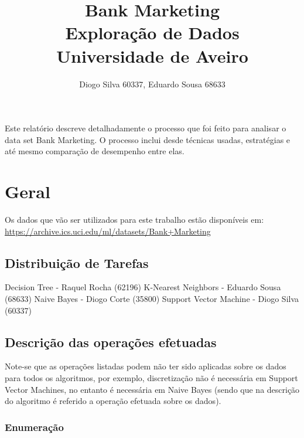 \documentclass[portugues,final]{revdetua}
\begin{document}

\title{\textbf{Bank Marketing}\\ Exploração de Dados \\Universidade de Aveiro}
\author{Diogo Silva 60337, Eduardo Sousa 68633}
\maketitle
\begin{resumo} %
Este relatório descreve detalhadamente o processo que foi feito para analisar o data set Bank Marketing.
O processo inclui desde técnicas usadas, estratégias e até mesmo comparação de desempenho entre elas.
\end{resumo}

\section{Geral}

Os dados que vão ser utilizados para este trabalho estão disponíveis em:
\url{https://archive.ics.uci.edu/ml/datasets/Bank+Marketing}

\subsection{Distribuição de Tarefas}

Decision Tree - Raquel Rocha (62196)
K-Nearest Neighbors - Eduardo Sousa (68633)
Naive Bayes - Diogo Corte (35800)
Support Vector Machine - Diogo Silva (60337)

\subsection{Descrição das operações efetuadas}

Note-se que as operações listadas podem não ter sido aplicadas sobre os dados para todos os algoritmos, por exemplo, discretização não é necessária em Support Vector Machines, no entanto é necessária em Naive Bayes (sendo que na descrição do algoritmo é referido a operação efetuada sobre os dados).

\subsubsection{Enumeração}
\end{document}
